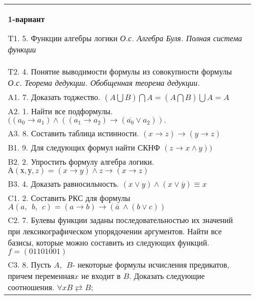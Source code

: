 \documentclass{article}
\begin{document}


\begin{tabular}{m{17cm}}
\textbf{1-вариант}
\newline

T1. 5. Функции алгебры логики \emph{О.с. Алгебра Буля. Полная система функции} \\
T2. 4. Понятие выводимости формулы из совокупности формулы \emph{О.с. Теорема дедукции. Обобщенная теорема дедукции.} \\
A1. 7. Доказать тоджество. \((A\bigcup B)\bigcap A = (A\bigcap B)\bigcup A = A\) \\
A2. 1. Найти все подформулы. \(((a_{0} \rightarrow a_{1}) \land ((a_{1} \rightarrow a_{2}) \rightarrow (\overline{a_{0}} \vee a_{2})).\) \\
A3. 8. Составить таблица истинности. \((x \rightarrow z) \rightarrow (y \rightarrow z)\) \\
B1. 9. Для следующих формул найти СКНФ \((z \rightarrow x \land y))\) \\
B2. 2. Упростить формулу алгебра логики. \(А(х,у,z) = (x \rightarrow y) \land z \rightarrow (x \rightarrow z)\) \\
B3. 4. Доказать равносильность. \((x \vee y) \land (x \vee \overline{y}) \equiv x\) \\
C1. 2. Составить РКС для формулы \(A(a,\ \ b,\ \ c) = (a \rightarrow b) \rightarrow (\overline{a}\  \land (b \vee c))\) \\
C2. 7. Булевы функции заданы последовательностью их значений при лексикографическом упорядочении аргументов. Найти все базисы, которые можно составить из следующих функций. \(f = (01101001)\) \\
C3. 8. Пусть \(A,\ \ B\)- некоторые формулы исчисления предикатов, причем переменная\(x\) не входит в \(B\). Доказать следующие соотношения. \(\forall xB \rightleftarrows B\); \\

\end{tabular}
\vspace{1cm}
\end{document}
